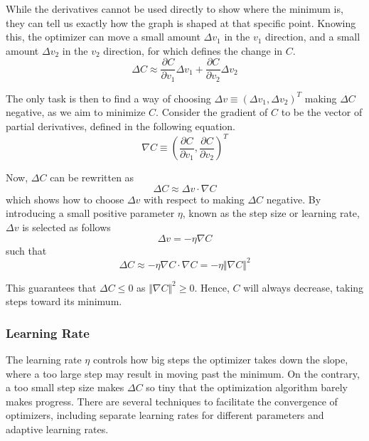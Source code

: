     While the derivatives cannot be used directly to show where the minimum is, they can tell us exactly how the graph is shaped at that specific point. 
    Knowing this, the optimizer can move a small amount $\Delta v_1$ in the $v_1$ direction, and a small amount $\Delta v_2$ in the $v_2$ direction, for which  defines the change in $C$.
    \begin{equation}\label{eq:mopt-DeltaC}
        \Delta C \approx \frac{\partial C}{\partial v_1}\Delta v_1 + \frac{\partial C}{\partial v_2} \Delta v_2
    \end{equation}
    
    The only task is then to find a way of choosing $\Delta v\equiv (\Delta v_1, \Delta v_2)^T$ making $\Delta C$ negative, as we aim to minimize $C$. Consider the gradient of $C$ to be the vector of partial derivatives, defined in the following equation.
    \begin{equation}\label{eq:mopt-gradient}
        \nabla C \equiv \left(\frac{\partial C}{\partial v_1}, \frac{\partial C}{\partial v_2}\right)^T
    \end{equation}
    
    Now, $\Delta C$ can be rewritten as
    \begin{equation}\label{eq:mopt-DeltaC-gradient}
        \Delta C \approx \Delta v \cdot \nabla C
    \end{equation}
    which shows how to choose $\Delta v$ with respect to making $\Delta C$ negative. By introducing a small positive parameter $\eta$, known as the step size or learning rate, $\Delta v$ is selected as follows
    \begin{equation}
        \Delta v = -\eta \nabla C
    \end{equation}
    such that 
    \begin{equation}
        \Delta C \approx -\eta \nabla C \cdot \nabla C = -\eta \Vert\nabla C\Vert^2
    \end{equation}
    
    This guarantees that $\Delta C \leq 0$ as $\Vert\nabla C\Vert^2 \geq 0$. Hence, $C$ will always decrease, taking steps toward its minimum. 
    
    \subsubsection{Learning Rate}
    
        The learning rate $\eta$ controls how big steps the optimizer takes down the slope, where a too large step may result in moving past the minimum. On the contrary, a too small step size makes $\Delta C$ so tiny that the optimization algorithm barely makes progress. There are several techniques to facilitate the convergence of optimizers, including separate learning rates for different parameters and adaptive learning rates.
        
